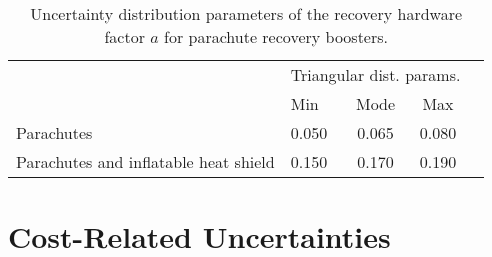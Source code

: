 \documentclass[conf]{../paper/new-aiaa}
\begin{document}
\begin{table}[hbt!]
    \centering
    \caption{\label{tab:parachute_pref_factor_distributions} Uncertainty distribution parameters of the recovery hardware factor $a$ for parachute recovery boosters.}
    \begin{tabular}{l l c c c}
    \hline
     & \multicolumn{3}{c}{Triangular dist. params.} \\
     & Min & Mode & Max \\
    \hline
    \hline
    Parachutes & 0.050 & 0.065 & 0.080 \\
    Parachutes and inflatable heat shield  & 0.150 & 0.170 & 0.190 \\
    \hline
    \end{tabular}
\end{table}

\section{Cost-Related Uncertainties}




\end{document}
